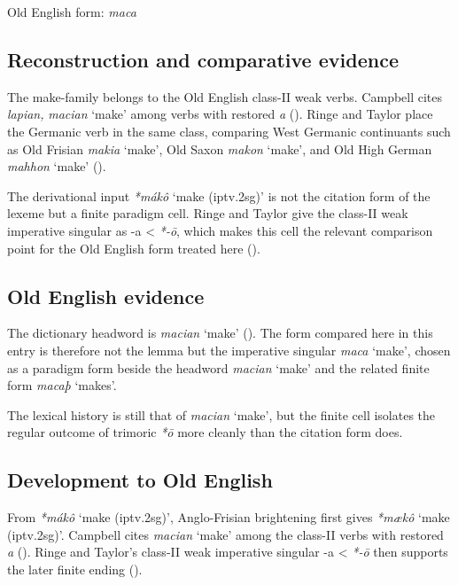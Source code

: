 \documentclass[
  british,
  a4paper,
  openany]{book}
\providecommand{\Recon}[1]{\emph{*#1}}
{\catcode`→=\active \global\def→{\ensuremath{\rightarrow}}}
\providecommand{\Recon}[1]{\emph{*#1}}
{\catcode`→=\active \global\def→{\ensuremath{\rightarrow}}}
\begin{document}
Old English form: \emph{maca}

\subsection{Reconstruction and comparative
evidence}\label{reconstruction-and-comparative-evidence-126}

The make-family belongs to the Old English class-II weak verbs. Campbell
cites \emph{lapian,} {\emph{macian}} `make' among verbs with restored
\emph{a} (). Ringe
and Taylor place the Germanic verb in the same class, comparing West
Germanic continuants such as Old Frisian {\emph{makia}} `make', Old
Saxon {\emph{makon}} `make', and Old High German {\emph{mahhon}} `make'
().

The derivational input {\Recon{mákô} `make (iptv.2sg)'} is not the
citation form of the lexeme but a finite paradigm cell. Ringe and Taylor
give the class-II weak imperative singular as -a \textless{} \emph{*-ō},
which makes this cell the relevant comparison point for the Old English
form treated here ().

\subsection{Old English evidence}\label{old-english-evidence-126}

The dictionary headword is {\emph{macian}} `make'
(). The form compared
here in this entry is therefore not the lemma but the imperative
singular {\emph{maca}} `make', chosen as a paradigm form beside the
headword {\emph{macian}} `make' and the related finite form
{\emph{macaþ}} `makes'.

The lexical history is still that of \emph{macian} `make', but the
finite cell isolates the regular outcome of trimoric \emph{*ō} more
cleanly than the citation form does.

\subsection{Development to Old
English}\label{development-to-old-english-126}

From \Recon{mákô} `make (iptv.2sg)', Anglo-Frisian brightening first
gives \Recon{mækô} `make (iptv.2sg)'. Campbell cites \emph{macian}
`make' among the class-II verbs with restored \emph{a}
(). Ringe and
Taylor's class-II weak imperative singular -a \textless{} \emph{*-ō}
then supports the later finite ending
().
\end{document}
